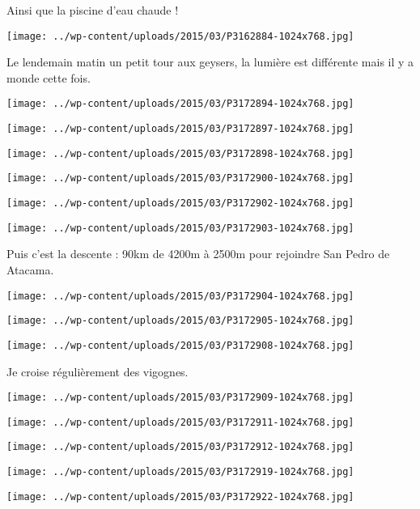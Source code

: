  Ainsi que la piscine d'eau chaude ! 
\begin{center} \texttt{[image: ../wp-content/uploads/2015/03/P3162884-1024x768.jpg]} \end{center}

\pagebreak
  Le lendemain matin un petit tour aux geysers, la lumière est différente mais il y a monde cette fois. 
\begin{center} \texttt{[image: ../wp-content/uploads/2015/03/P3172894-1024x768.jpg]} \end{center}
\begin{center} \texttt{[image: ../wp-content/uploads/2015/03/P3172897-1024x768.jpg]} \end{center}
\begin{center} \texttt{[image: ../wp-content/uploads/2015/03/P3172898-1024x768.jpg]} \end{center}
\begin{center} \texttt{[image: ../wp-content/uploads/2015/03/P3172900-1024x768.jpg]} \end{center}
\begin{center} \texttt{[image: ../wp-content/uploads/2015/03/P3172902-1024x768.jpg]} \end{center}
\begin{center} \texttt{[image: ../wp-content/uploads/2015/03/P3172903-1024x768.jpg]} \end{center}

\pagebreak
 Puis c'est la descente : 90km de 4200m à 2500m pour rejoindre San Pedro de Atacama. 
\begin{center} \texttt{[image: ../wp-content/uploads/2015/03/P3172904-1024x768.jpg]} \end{center}
\begin{center} \texttt{[image: ../wp-content/uploads/2015/03/P3172905-1024x768.jpg]} \end{center}
\begin{center} \texttt{[image: ../wp-content/uploads/2015/03/P3172908-1024x768.jpg]} \end{center}

 Je croise régulièrement des vigognes.
\begin{center} \texttt{[image: ../wp-content/uploads/2015/03/P3172909-1024x768.jpg]} \end{center}
\begin{center} \texttt{[image: ../wp-content/uploads/2015/03/P3172911-1024x768.jpg]} \end{center}
\begin{center} \texttt{[image: ../wp-content/uploads/2015/03/P3172912-1024x768.jpg]} \end{center}
\begin{center} \texttt{[image: ../wp-content/uploads/2015/03/P3172919-1024x768.jpg]} \end{center}
\begin{center} \texttt{[image: ../wp-content/uploads/2015/03/P3172922-1024x768.jpg]} \end{center}

